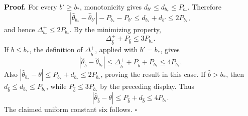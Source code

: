 \textbf{Proof.} For every \(b'\ge b_*\), monotonicity gives \(d_{b'}\le d_{b_*}\le P_{b_*}\). Therefore
\[
|\widehat\theta_{b_*}-\widehat\theta_{b'}|-P_{b_*}-P_{b'}
\le d_{b_*}+d_{b'}
\le2P_{b_*},
\]
and hence \(\Delta_{b_*}^+\le2P_{b_*}\). By the minimizing property,
\[
\Delta_{\widehat b}^++P_{\widehat b}\le3P_{b_*}.
\]
If \(\widehat b\le b_*\), the definition of \(\Delta_{\widehat b}^+\), applied with \(b'=b_*\), gives
\[
|\widehat\theta_{\widehat b}-\widehat\theta_{b_*}|
\le \Delta_{\widehat b}^++P_{\widehat b}+P_{b_*}
\le4P_{b_*}.
\]
Also \(|\widehat\theta_{b_*}-\theta|\le P_{b_*}+d_{b_*}\le2P_{b_*}\), proving the result in this case. If \(\widehat b>b_*\), then \(d_{\widehat b}\le d_{b_*}\le P_{b_*}\), while \(P_{\widehat b}\le3P_{b_*}\) by the preceding display. Thus
\[
|\widehat\theta_{\widehat b}-\theta|
\le P_{\widehat b}+d_{\widehat b}
\le4P_{b_*}.
\]
The claimed uniform constant six follows. \(\square\)